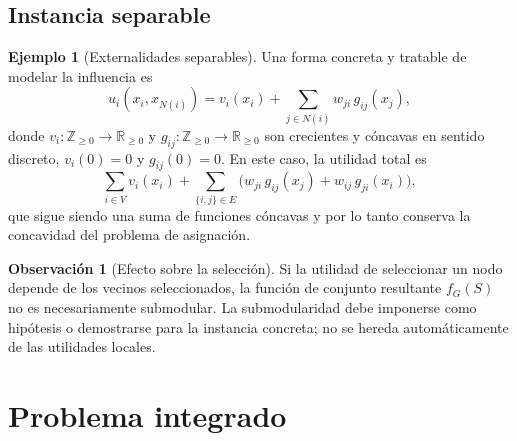 \documentclass[11pt,a4paper]{article}
\theoremstyle{definition}
\newtheorem{observacion}[definicion]{Observación}
\newtheorem{ejemplo}[definicion]{Ejemplo}
\theoremstyle{plain}
\newcommand{\Z}{\mathbb{Z}}
\newcommand{\R}{\mathbb{R}}
\begin{document}
\subsection{Instancia separable}

\begin{ejemplo}[Externalidades separables]\label{ej:red}
Una forma concreta y tratable de modelar la influencia es
\[
  u_i(x_i,x_{N(i)})
  =
  v_i(x_i)
  +
  \sum_{j\in N(i)} w_{ji}\,g_{ij}(x_j),
\]
donde $v_i:\Z_{\ge0}\to\R_{\ge0}$ y $g_{ij}:\Z_{\ge0}\to\R_{\ge0}$ son
crecientes y cóncavas en sentido discreto, $v_i(0)=0$ y $g_{ij}(0)=0$. En este
caso, la utilidad total es
\[
  \sum_{i\in V} v_i(x_i)
  +
  \sum_{\{i,j\}\in E} \bigl(w_{ji}\,g_{ij}(x_j)+w_{ij}\,g_{ji}(x_i)\bigr),
\]
que sigue siendo una suma de funciones cóncavas y por lo tanto conserva la
concavidad del problema de asignación.
\end{ejemplo}

\begin{observacion}[Efecto sobre la selección]
Si la utilidad de seleccionar un nodo depende de los vecinos seleccionados,
la función de conjunto resultante $f_G(S)$ no es necesariamente submodular.
La submodularidad debe imponerse como hipótesis o demostrarse para la
instancia concreta; no se hereda automáticamente de las utilidades locales.
\end{observacion}

\section{Problema integrado}
\end{document}
